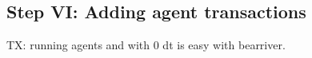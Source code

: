 \subsection{Step VI: Adding agent transactions}
TX: running agents and with 0 dt is easy with bearriver.